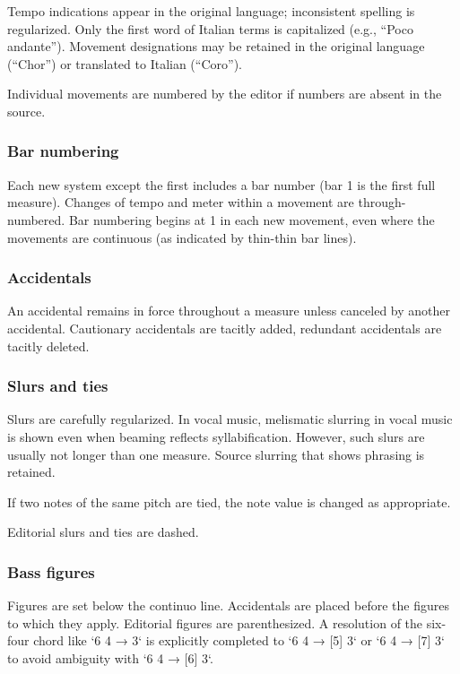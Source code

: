 \documentclass{ees}
\begin{document}
Tempo indications appear in the original language; inconsistent spelling is regularized. Only the first word of Italian terms is capitalized (e.g., “Poco andante”). Movement designations may be retained in the original language (“Chor”) or translated to Italian (“Coro”).

Individual movements are numbered by the editor if numbers are absent in the source.


\subsubsection{Bar numbering}

Each new system except the first includes a bar number (bar 1 is the first full measure). Changes of tempo and meter within a movement are through-numbered. Bar numbering begins at 1 in each new movement, even where the movements are continuous (as indicated by thin-thin bar lines).


\subsubsection{Accidentals}

An accidental remains in force throughout a measure unless canceled by another accidental. Cautionary accidentals are tacitly added, redundant accidentals are tacitly deleted.


\subsubsection{Slurs and ties}

Slurs are carefully regularized. In vocal music, melismatic slurring in vocal music is shown even when beaming reflects syllabification. However, such slurs are usually not longer than one measure. Source slurring that shows phrasing is retained.

If two notes of the same pitch are tied, the note value is changed as appropriate.

Editorial slurs and ties are dashed.


\subsubsection{Bass figures}

Figures are set below the continuo line. Accidentals are placed before the figures to which they apply. Editorial figures are parenthesized. A resolution of the six-four chord like `6 4 → 3` is explicitly completed to `6 4 → [5] 3` or `6 4 → [7] 3` to avoid ambiguity with `6 4 → [6] 3`.
\end{document}
